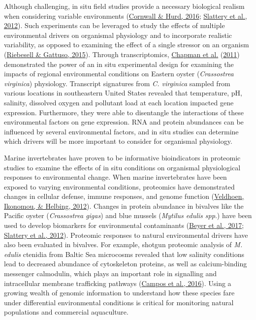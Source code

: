 \documentclass [11pt, proquest] {uwthesis}[2015/03/03]
\begin{document}
Although challenging, in situ field studies provide a necessary biological realism when considering variable environments (\protect\hyperlink{ref-Cornwall2016}{Cornwall \& Hurd, 2016}; \protect\hyperlink{ref-Slattery2012}{Slattery et al., 2012}). Such experiments can be leveraged to study the effects of multiple environmental drivers on organismal physiology and to incorporate realistic variability, as opposed to examining the effect of a single stressor on an organism (\protect\hyperlink{ref-Riebesell2015}{Riebesell \& Gattuso, 2015}). Through transcriptomics, \protect\hyperlink{ref-Chapman2011}{Chapman et al.} (\protect\hyperlink{ref-Chapman2011}{2011}) demonstrated the power of an in situ experimental design for examining the impacts of regional environmental conditions on Eastern oyster (\emph{Crassostrea virginica}) physiology. Transcript signatures from \emph{C. virginica} sampled from various locations in southeastern United States revealed that temperature, pH, salinity, dissolved oxygen and pollutant load at each location impacted gene expression. Furthermore, they were able to disentangle the interactions of these environmental factors on gene expression. RNA and protein abundances can be influenced by several environmental factors, and in situ studies can determine which drivers will be more important to consider for organismal physiology.

Marine invertebrates have proven to be informative bioindicators in proteomic studies to examine the effects of in situ conditions on organismal physiological responses to environmental change. When marine invertebrates have been exposed to varying environmental conditions, proteomics have demonstrated changes in cellular defense, immune responses, and genome function (\protect\hyperlink{ref-Veldhoen2012}{Veldhoen, Ikonomou, \& Helbing, 2012}). Changes in protein abundance in bivalves like the Pacific oyster (\emph{Crassostrea gigas}) and blue mussels (\emph{Mytilus edulis spp}.) have been used to develop biomarkers for environmental contaminants (\protect\hyperlink{ref-Beyer2017}{Beyer et al., 2017}; \protect\hyperlink{ref-Slattery2012}{Slattery et al., 2012}). Proteomic responses to natural environmental drivers have also been evaluated in bivalves. For example, shotgun proteomic analysis of \emph{M. edulis} ctenidia from Baltic Sea microcosms revealed that low salinity conditions lead to decreased abundance of cytoskeleton proteins, as well as calcium-binding messenger calmodulin, which plays an important role in signalling and intracellular membrane trafficking pathways (\protect\hyperlink{ref-Campos2016}{Campos et al., 2016}). Using a growing wealth of genomic information to understand how these species fare under differential environmental conditions is critical for monitoring natural populations and commercial aquaculture.
\end{document}
